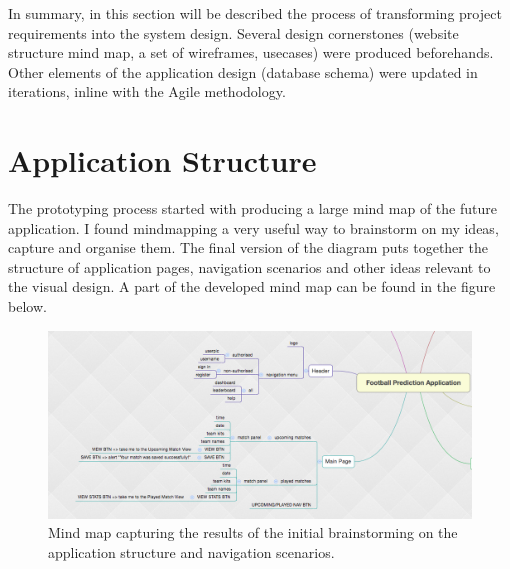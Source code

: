 In summary, in this section will be described the process of transforming project requirements into the system design. Several design cornerstones (website structure mind map, a set of wireframes, usecases) were produced beforehands. Other elements of the application design (database schema) were updated in iterations, inline with the Agile methodology. 

\section{Application Structure}
\label{sec:applicationstructure_prototype}
The prototyping process started with producing a large mind map of the future application. I found mindmapping a very useful way to brainstorm on my ideas, capture and organise them. The final version of the diagram puts together the structure of application pages, navigation scenarios and other ideas relevant to the visual design. A part of the developed mind map can be found in the figure below.

\begin{figure}[H]
	\begin{center}
		\includegraphics[width=.90\textwidth]{design/images/mindmap}
		\caption{Mind map capturing the results of the initial brainstorming on the application structure and navigation scenarios.}
		\label{fig:using:mindmap}
	\end{center}
\end{figure}

